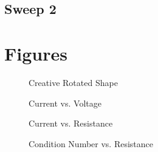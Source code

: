 \documentclass{article}
\begin{document}
\subsection{Sweep 2}


\pagebreak
\section{Figures}

\begin{figure}[htb!]
\begin{center}
\caption{Creative Rotated Shape}
\end{center}
\end{figure}

\begin{figure}[htb!]
\begin{center}
\caption{Current vs. Voltage}
\end{center}
\end{figure}

\begin{figure}[htb!]
\begin{center}
\caption{Current vs. Resistance}
\end{center}
\end{figure}

\begin{figure}[htb!]
\begin{center}
\caption{Condition Number vs. Resistance}
\end{center}
\end{figure}
\end{document}
